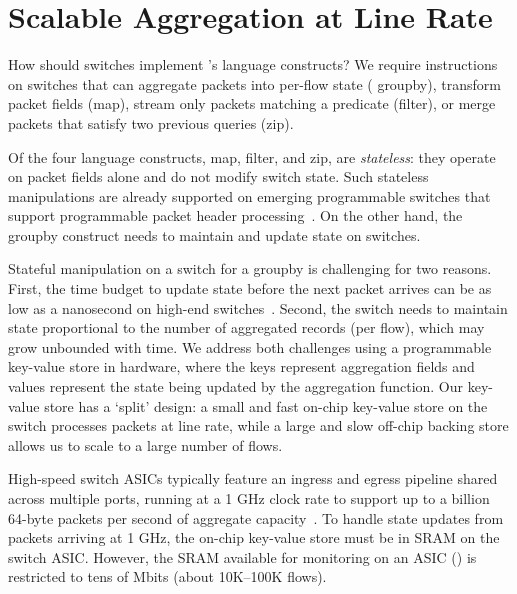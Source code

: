 \section{Scalable Aggregation at Line Rate}
\label{sec:aggregation}

How should switches implement \TheSystem's language constructs? We require
instructions on switches that can aggregate packets into per-flow state ({\ct
groupby}), transform packet fields ({\ct map}), stream only packets matching a
predicate ({\ct filter}), or merge packets that satisfy two previous queries
({\ct zip}).

Of the four language constructs, {\ct map}, {\ct filter},
and {\ct zip}, are {\em stateless}: they operate on packet fields alone and do not
modify switch state. Such stateless manipulations are already supported on
emerging programmable switches that support programmable packet header
processing~\cite{rmt, xpliant, flexpipe, tofino}. On the other hand, the {\ct
groupby} construct needs to maintain and update state on switches.


Stateful manipulation on a switch for a {\ct groupby} is challenging for two reasons. First, the
time budget to update state before the next packet arrives can be as low as a
nanosecond on high-end switches~\cite{domino_sigcomm}. Second, the switch needs
to maintain state proportional to the number of aggregated records (\eg per flow), which may grow unbounded
with time. We address both challenges using a programmable key-value store in
hardware, where the keys represent aggregation fields and values
represent the state being updated by the aggregation function.
Our key-value store has a `split' design: a small and fast
on-chip key-value store on the switch processes packets at line rate, while a
large and slow off-chip backing store allows us to scale to a large number of
flows.

High-speed switch ASICs typically feature an ingress and egress pipeline
shared across multiple ports, running at a 1 GHz clock rate to support up to a
billion 64-byte packets per second of aggregate capacity~\cite{rmt}.  To handle
state updates from packets arriving at 1 GHz, the on-chip key-value store must
be in SRAM on the switch ASIC. However, the SRAM available for monitoring on an
ASIC () is restricted to tens of Mbits (about 10K--100K flows).

